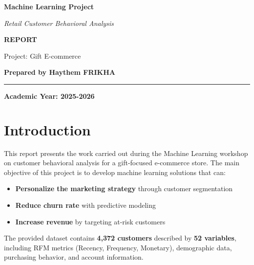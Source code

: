 \documentclass[12pt,a4paper]{article}
\begin{document}
\begin{titlepage}
\vspace{2cm}

\begin{center}
{\Huge\textbf{Machine Learning Project}}\par
\vspace{0.5cm}
{\Large\textit{Retail Customer Behavioral Analysis}}\par

\vspace{4cm}

{\LARGE\textbf{REPORT}}\par
\vspace{1cm}
{\large Project: Gift E-commerce}\par
\vspace{2cm}
{\large \textbf{Prepared by Haythem FRIKHA}}
\vspace{3cm}

\rule{10cm}{2pt}

\vspace{5cm}

{\textbf{Academic Year: 2025-2026}}

\end{center}
\vfill
\end{titlepage}

\tableofcontents
\newpage

\section{Introduction}

This report presents the work carried out during the Machine Learning workshop on customer behavioral analysis for a gift-focused e-commerce store. The main objective of this project is to develop machine learning solutions that can:

\begin{itemize}
    \item \textbf{Personalize the marketing strategy} through customer segmentation
    \item \textbf{Reduce churn rate} with predictive modeling
    \item \textbf{Increase revenue} by targeting at-risk customers
\end{itemize}

The provided dataset contains \textbf{4,372 customers} described by \textbf{52 variables}, including RFM metrics (Recency, Frequency, Monetary), demographic data, purchasing behavior, and account information.
\end{document}
